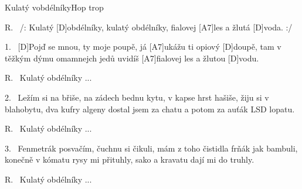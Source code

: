 \begin{song}{Kulatý vobdélníky}{Hop trop}

\begin{xverse}{R.~}
/: Kulatý [D]obdélníky, kulatý obdélníky,
fialovej [A7]les a žlutá [D]voda. :/
\end{xverse}

\begin{xverse}{1.~}
[D]Pojď se mnou, ty moje poupě,
já [A7]ukážu ti opiový [D]doupě,
tam v těžkým dýmu omamnejch jedů
uvidíš [A7]fialovej les a žlutou [D]vodu.
\end{xverse}

\begin{xverse}{R.~}
Kulatý obdélníky ...
\end{xverse}

\begin{xverse}{2.~}
Ležím si na břiše, na zádech bednu kytu,
v kapse hrst hašiše, žiju si v blahobytu,
dva kufry algeny dostal jsem za chatu
a potom za auťák LSD lopatu.
\end{xverse}

\begin{xverse}{R.~}
Kulatý obdélníky ...
\end{xverse}

\begin{xverse}{3.~}
Fenmetrák posvačím, čuchnu si čikuli,
mám z toho čistidla frňák jak bambuli,
konečně v kómatu rysy mi přituhly,
sako a kravatu dají mi do truhly.
\end{xverse}

\begin{xverse}{R.~}
Kulatý obdélníky ...
\end{xverse}

\end{song}

